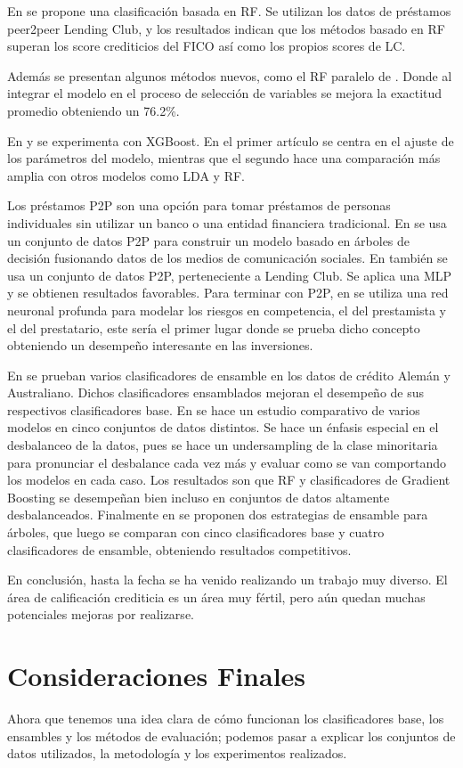 En \citep{malekipirbazari2015risk} se propone una clasificación basada en \ac{RF}. Se utilizan los datos de préstamos peer2peer Lending Club, y los resultados indican que los métodos basado en \ac{RF} superan los score crediticios del FICO así como los propios scores de LC.

Además se presentan algunos métodos nuevos, como el \ac{RF} paralelo de \citep{van2016novel}. Donde al integrar el modelo en el proceso de selección de variables se mejora la exactitud promedio obteniendo un 76.2\%.

En \citep{xia2017boosted} y \citep{bhatia2017credit} se experimenta con \ac{XGBoost}. En el primer artículo se centra en el ajuste de los parámetros del modelo, mientras que el segundo hace una comparación más amplia con otros modelos como \ac{LDA} y \ac{RF}.

Los préstamos \ac{P2P} son una opción para tomar préstamos de personas individuales sin utilizar un banco o una entidad financiera tradicional. En \citep{zhang2016research} se usa un conjunto de datos \ac{P2P} para construir un modelo basado en árboles de decisión fusionando datos de los medios de comunicación sociales. En \citep{zang2014credit} también se usa un conjunto de datos \ac{P2P}, perteneciente a Lending Club. Se aplica una \ac{MLP} y se obtienen resultados favorables. Para terminar con \ac{P2P}, en \citep{tan2018deep} se utiliza una red neuronal profunda para modelar los riesgos en competencia, el del prestamista y el del prestatario, este sería el primer lugar donde se prueba dicho concepto obteniendo un desempeño interesante en las inversiones.

En \citep{nanni2009experimental} se prueban varios clasificadores de ensamble en los datos de crédito Alemán y Australiano. Dichos clasificadores ensamblados mejoran el desempeño de sus respectivos clasificadores base. En \citep{brown2012experimental} se hace un estudio comparativo de varios modelos en cinco conjuntos de datos distintos. Se hace un énfasis especial en el desbalanceo de la datos, pues se hace un undersampling de la clase minoritaria para pronunciar el desbalance cada vez más y evaluar como se van comportando los modelos en cada caso. Los resultados son que \ac{RF} y clasificadores de Gradient Boosting se desempeñan bien incluso en conjuntos de datos altamente desbalanceados. Finalmente en \citep{wang2012two} se proponen dos estrategias de ensamble para árboles, que luego se comparan con cinco clasificadores base y cuatro clasificadores de ensamble, obteniendo resultados competitivos.

En conclusión, hasta la fecha se ha venido realizando un trabajo muy diverso. El área de calificación crediticia es un área muy fértil, pero aún quedan muchas potenciales mejoras por realizarse.

\section{Consideraciones Finales}

Ahora que tenemos una idea clara de cómo funcionan los clasificadores base, los ensambles y los métodos de evaluación; podemos pasar a explicar los conjuntos de datos utilizados, la metodología y los experimentos realizados.
